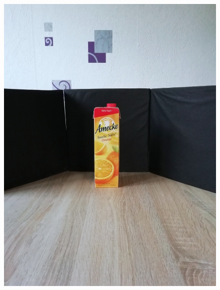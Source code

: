 \documentclass[a4paper,12pt,oneside]{article}
\begin{document}
\begin{figure}[htb]
\begin{minipage}[c]{0.2\textwidth}
\includegraphics[width=\textwidth]{Sources/Bild3_GW.jpg}
\end{minipage}
\hfill
\begin{minipage}[c]{0.08\textwidth}

\end{minipage}
\end{figure}
\end{document}
